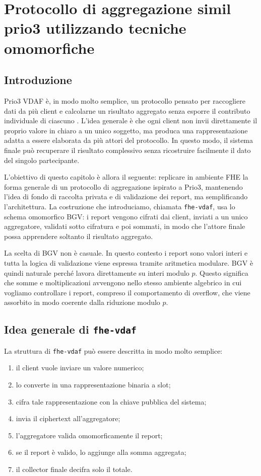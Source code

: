 \chapter{Protocollo di aggregazione simil prio3 utilizzando tecniche omomorfiche}

\section{Introduzione}
Prio3 VDAF \`e, in modo molto semplice, un protocollo pensato per raccogliere dati da pi\`u client e calcolarne un risultato aggregato senza esporre il contributo individuale di ciascuno \cite{prio}. L'idea generale \`e che ogni client non invii direttamente il proprio valore in chiaro a un unico soggetto, ma produca una rappresentazione adatta a essere elaborata da pi\`u attori del protocollo. In questo modo, il sistema finale pu\`o recuperare il risultato complessivo senza ricostruire facilmente il dato del singolo partecipante.

L'obiettivo di questo capitolo \`e allora il seguente: replicare in ambiente FHE la forma generale di un protocollo di aggregazione ispirato a Prio3, mantenendo l'idea di fondo di raccolta privata e di validazione dei report, ma semplificando l'architettura. La costruzione che introduciamo, chiamata \texttt{fhe-vdaf}, usa lo schema omomorfico BGV: i report vengono cifrati dai client, inviati a un unico aggregatore, validati sotto cifratura e poi sommati, in modo che l'attore finale possa apprendere soltanto il risultato aggregato.

La scelta di BGV non \`e casuale. In questo contesto i report sono valori interi e tutta la logica di validazione viene espressa tramite aritmetica modulare. BGV \`e quindi naturale perch\'e lavora direttamente su interi modulo $p$. Questo significa che somme e moltiplicazioni avvengono nello stesso ambiente algebrico in cui vogliamo controllare i report, compreso il comportamento di overflow, che viene assorbito in modo coerente dalla riduzione modulo $p$.

\section{Idea generale di \texttt{fhe-vdaf}}
La struttura di \texttt{fhe-vdaf} pu\`o essere descritta in modo molto semplice:
\begin{enumerate}
  \item il client vuole inviare un valore numerico;
  \item lo converte in una rappresentazione binaria a slot;
  \item cifra tale rappresentazione con la chiave pubblica del sistema;
  \item invia il ciphertext all'aggregatore;
  \item l'aggregatore valida omomorficamente il report;
  \item se il report \`e valido, lo aggiunge alla somma aggregata;
  \item il collector finale decifra solo il totale.
\end{enumerate}

